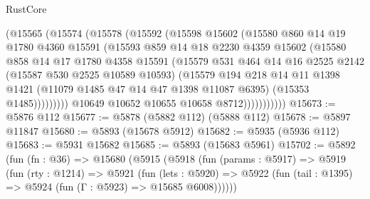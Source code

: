 \begin{lexlean}{RustCore}
\begin{coremodule}
                      (@15565
                        (@15574
                          (@15578
                            (@15592
                              (@15598
                                @15602
                                (@15580
                                  @860
                                  @14
                                  @19
                                  @1780
                                  @4360
                                  @15591
                                  (@15593
                                    @859
                                    @14
                                    @18
                                    @2230
                                    @4359
                                    @15602
                                    (@15580
                                      @858
                                      @14
                                      @17
                                      @1780
                                      @4358
                                      @15591
                                      (@15579
                                        @531
                                        @464
                                        @14
                                        @16
                                        @2525
                                        @2142
                                        (@15587 @530 @2525 @10589 @10593)
                                        (@15579
                                          @194
                                          @218
                                          @14
                                          @11
                                          @1398
                                          @1421
                                          (@11079 @1485 @47 @14 @47 @1398 @11087 @6395)
                                          (@15353 @1485)))))))))
                          @10649
                          @10652
                          @10655
                          @10658
                          @8712)))))))))))
@15673 := @5876 @112
@15677 := @5878 (@5882 @112) (@5888 @112)
@15678 := @5897 @11847
@15680 := @5893 (@15678 @5912)
@15682 := @5935 (@5936 @112)
@15683 := @5931 @15682
@15685 := @5893 (@15683 @5961)
@15702 := @5892
    (fun (fn : @36) =>
    @15680
      (@5915
        (@5918
          (fun (params : @5917) =>
          @5919
            (fun (rty : @1214) =>
            @5921
              (fun (lets : @5920) =>
              @5922 (fun (tail : @1395) => @5924 (fun (Γ : @5923) => @15685 @6008))))))

\end{coremodule}
\end{lexlean}

